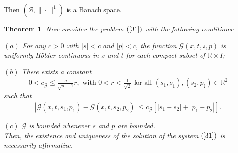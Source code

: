 \documentclass[11pt,reqno,a4paper]{amsart}
\theoremstyle{plain}
\newtheorem{theorem}{Theorem}[section]
\theoremstyle{definition}
\theoremstyle{remark}
\numberwithin{equation}{section}
\begin{document}
Then $(\mathcal{B},\|\cdot\|^1)$ is a Banach space.

\begin{theorem}\label{31.5}
Now consider the problem $(\ref{31})$ with the following conditions:

$(a)$ For any $c>0$ with $|s|<c$ and $|p|<c$, the function $\mathcal{G}(x,t,s,p)$ is uniformly H\"older continuous in $x$ and $t$ for each compact subset of $\mathbb{R}\times I$;

$(b)$ There exists a constant
\begin{align}\label{32}
0<c_\mathcal{G}\le \frac{a}{\sqrt{a}+1}r, \text{ with }0<r<\frac{1}{\sqrt{2}} \text{ for all }(s_1,p_1),(s_2,p_2)\in \mathbb{R}^2 
\end{align} 
such that 
\begin{align}\label{33}
|\mathcal{G}(x,t,s_1,p_1)-\mathcal{G}(x,t,s_2,p_2)|\le c_\mathcal{G}[|s_1-s_2|+|p_1-p_2|].
\end{align}

$(c)$ $\mathcal{G}$ is bounded whenever $s$ and $p$ are bounded.\\
Then, the existence and uniqueness of the solution of the system $(\ref{31})$ is necessarily affirmative.
\end{theorem}
\end{document}
